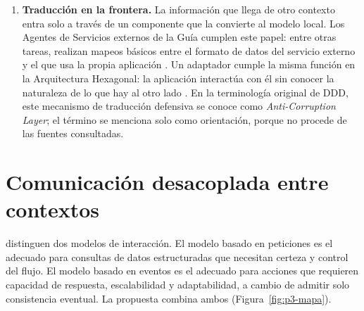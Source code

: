 \begin{enumerate}[label=\textbf{M\arabic*.}, leftmargin=2.2em]
  \item \textbf{Traducción en la frontera.} La información que llega de otro contexto
        entra solo a través de un componente que la convierte al modelo local. Los
        Agentes de Servicios externos de la Guía cumplen este papel: entre otras tareas,
        realizan mapeos básicos entre el formato de datos del servicio externo y el que usa
        la propia aplicación \parencite[108, 155]{delatorre2010}. Un adaptador cumple la
        misma función en la Arquitectura Hexagonal: la aplicación interactúa con él sin
        conocer la naturaleza de lo que hay al otro lado
        \parencite{cockburn2005}. En la terminología original de DDD, este mecanismo de
        traducción defensiva se conoce como \textit{Anti-Corruption Layer}; el término se
        menciona solo como orientación, porque no procede de las fuentes consultadas.
\end{enumerate}

\section{Comunicación desacoplada entre contextos}
\label{sec:p3-comunicacion}

\textcite[cap.~14]{richardsford2020} distinguen dos modelos de interacción. El modelo
basado en peticiones es el adecuado para consultas de datos estructuradas que necesitan
certeza y control del flujo. El modelo basado en eventos es el adecuado para acciones que
requieren capacidad de respuesta, escalabilidad y adaptabilidad, a cambio de admitir solo
consistencia eventual. La propuesta combina ambos (Figura~\ref{fig:p3-mapa}).

